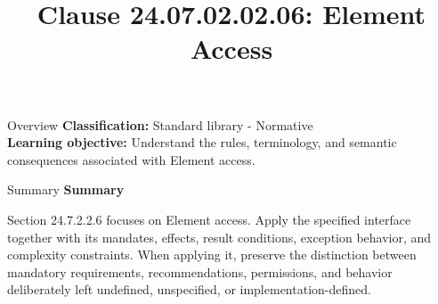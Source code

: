 \documentclass[10pt,letterpaper]{article}
\title{Clause 24.07.02.02.06: Element Access}
\author{}
\date{}
\begin{document}
\maketitle
\begin{CornellOverviewBox}{Overview}
\textbf{Classification:} Standard library - Normative\\[2pt]
\textbf{Learning objective:} Understand the rules, terminology, and semantic consequences associated with Element access.
\end{CornellOverviewBox}\begin{CornellSummaryBox}{Summary}
{\sffamily\bfseries\color{Accent} Summary}\par\vspace{3pt}Section 24.7.2.2.6 focuses on Element access. Apply the specified interface together with its mandates, effects, result conditions, exception behavior, and complexity constraints. When applying it, preserve the distinction between mandatory requirements, recommendations, permissions, and behavior deliberately left undefined, unspecified, or implementation-defined.
\end{CornellSummaryBox}
\end{document}
